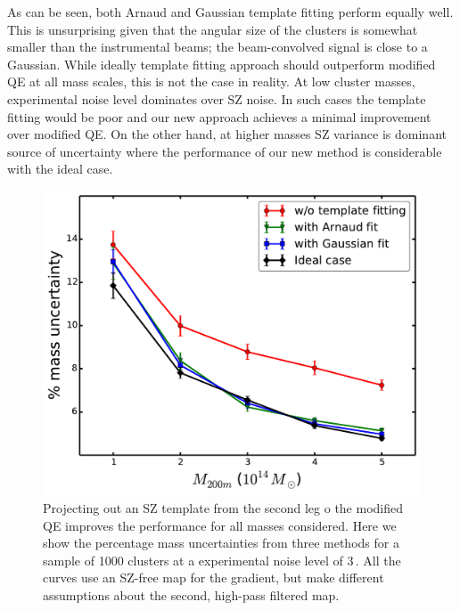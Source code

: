 {As can be seen, both Arnaud and Gaussian template fitting perform equally well.
 This is unsurprising given that the angular size of the clusters is somewhat smaller than the instrumental beams; the beam-convolved signal is close to a Gaussian. 
While ideally template fitting approach should outperform modified QE at all mass scales, this is not the case in reality.
At low cluster masses, experimental noise level dominates over SZ noise.
 In such cases the template fitting would be poor and our new approach achieves a minimal improvement over modified QE. 
 On the other hand, at higher masses SZ variance is dominant source of uncertainty where the performance of our new method is considerable with the ideal case. %
 \begin{figure}[htb]
\includegraphics[width=\linewidth]{figs/uncen_vs_mass.pdf}
 \caption{
 Projecting out an SZ template from the second leg o the modified QE improves the performance for all masses considered. 
 Here we show the percentage mass uncertainties from three methods for a sample of 1000 clusters at a experimental noise level of 3\,\ukarcmin{}.
 All the curves use an SZ-free map for the gradient, but make different assumptions about the second, high-pass filtered map. 
}
\end{figure}}
